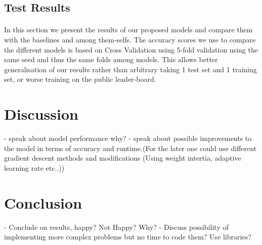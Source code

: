 \documentclass[sigconf, nonacm]{acmart}
\begin{document}
\subsection{Test Results}
\paragraph{} In this section we present the results of our proposed models and compare them with the baselines and among them-selfs. The accuracy scores we use to compare the different models is based on Cross Validation using 5-fold validation using the same seed and thus the same folds among models. This allows better generalisation of our results rather than arbitrary taking 1 test set and 1 training set, or worse training on the public leader-board.

\section{Discussion}
- speak about model performance why?
- speak about possible improvements to the model in terms of accuracy and runtime.(For the later one could use different gradient descent methods and modifications (Using weight intertia, adaptive learning rate etc..))

\section{Conclusion}
- Conclude on results, happy? Not Happy? Why? 
- Discuss possibility of implementing more complex problems but no time to code them? Use libraries?







%
%
\end{document}
